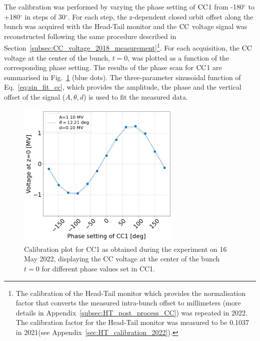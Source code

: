The calibration was performed by varying the phase setting of ${\mathrm{CC}}$1 from -180$^\circ$ to +180$^\circ$ in steps of 30$^\circ$. For each step, the z-dependent closed orbit offset along the bunch was acquired with the Head-Tail monitor and the ${\mathrm{CC}}$ voltage signal was reconstructed following the same procedure described in Section~\ref{subsec:CC_voltage_2018_measurement}\footnote{The calibration of the Head-Tail monitor which provides the normalisation factor that converts the measured intra-bunch offset to millimeters (more details in Appendix~\ref{subsec:HT_post_process_CC}) was repeated in 2022. The calibration factor for the Head-Tail monitor was measured to be 0.1037 in 2021(see Appendix~\ref{sec:HT_calibration_2022}).}. For each acquisition, the ${\mathrm{CC}}$ voltage at the center of the bunch, $t=0$, was plotted as a function of the corresponding phase setting. The results of the phase scan for ${\mathrm{CC}}$1 are summarised in Fig.~\ref{fig:Vcc_calibration_md_2022} (blue dots). 
The three-parameter sinusoidal function of Eq.~\eqref{eq:sin_fit_cc}, which provides the amplitude, the phase and the vertical offset of the signal ($A, \theta, d$) is used to fit the measured data.



\begin{figure}[!h] %
   \centering         
   \includegraphics[width=0.7\textwidth]{images/Ch8/Vcc_at_z_zero_vs_inspector_phase_CC1_for_thesis_new_xlabel_may22.png}
       \caption{Calibration plot for CC1 as obtained during the experiment on 16 May 2022, displaying the CC voltage at the center of the bunch $t=0$ for different phase values set in CC1.}
       \label{fig:Vcc_calibration_md_2022}
\end{figure}

